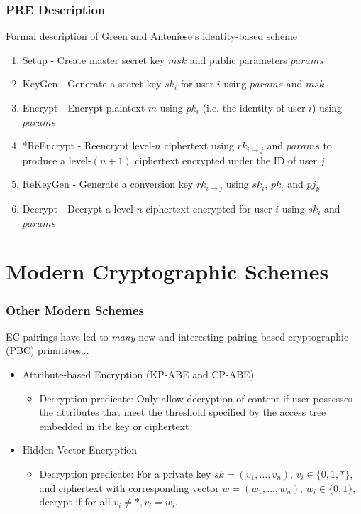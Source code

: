 \documentclass[handout]{beamer}
\begin{document}
\begin{frame}
	\frametitle{PRE Description}
	Formal description of Green and Anteniese's identity-based scheme
	\begin{enumerate}
		\item Setup - Create master secret key $msk$ and public parameters $params$
		\item KeyGen - Generate a secret key $sk_i$ for user $i$ using $params$ and $msk$
		\item Encrypt - Encrypt plaintext $m$ using $pk_i$ (i.e. the identity of user $i$) using $params$
		\item *ReEncrypt - Reencrypt level-$n$ ciphertext using $rk_{i \to j}$ and $params$ to produce a level-$(n+1)$ ciphertext encrypted under the ID of user $j$
		\item ReKeyGen - Generate a conversion key $rk_{i \to j}$ using $sk_i$, $pk_i$ and $pj_k$
		\item Decrypt - Decrypt a level-$n$ ciphertext encrypted for user $i$ using $sk_i$ and $params$
	\end{enumerate}
\end{frame}

\section{Modern Cryptographic Schemes}
\begin{frame}
	\frametitle{Other Modern Schemes}
	EC pairings have led to \emph{many} new and interesting pairing-based cryptographic (PBC) primitives...
	\begin{itemize}
		\item Attribute-based Encryption (KP-ABE and CP-ABE)
		\begin{itemize}
			\item Decryption predicate: Only allow decryption of content if user possesses the attributes that meet the threshold specified by the access tree embedded in the key or ciphertext
		\end{itemize}
		\pause
		\item Hidden Vector Encryption
		\begin{itemize}
			\item Decryption predicate: For a private key $\bar{sk} = (v_1,\dots,v_n)$, $v_i \in \{0,1,*\}$, and ciphertext with corresponding vector $\bar{w} = (w_1,\dots,w_n)$, $w_i \in \{0,1\}$, decrypt if for all $v_i \not= *, v_i = w_i$.
		\end{itemize}
	\end{itemize}
\end{frame}
\end{document}
